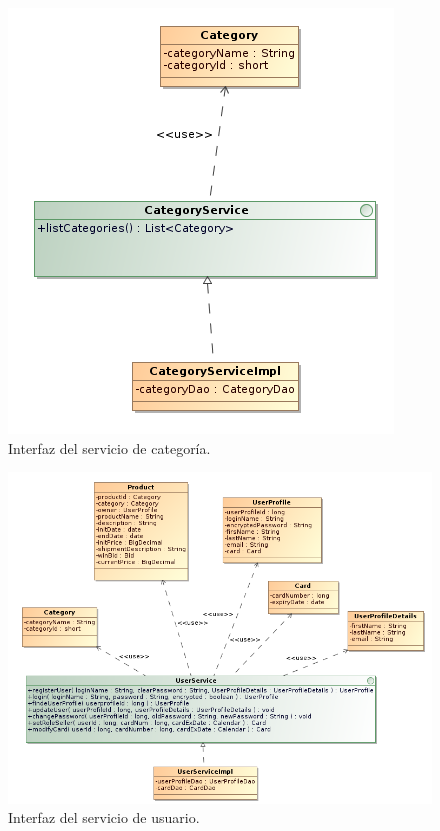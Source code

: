 \documentclass[12pt,a4paper,twoside,spanish]{article}      %
\begin{document}
\begin{figure}[H]
  \centering
    \includegraphics[scale=0.9]{CategoryService}
  \caption{Interfaz del servicio de categoría.}
  \label{fig:CategoryService}
\end{figure}

\begin{figure}[H]
  \centering
    \includegraphics[scale=0.8]{user_service}
  \caption{Interfaz del servicio de usuario.}
  \label{fig:UserService}
\end{figure}
\end{document}
